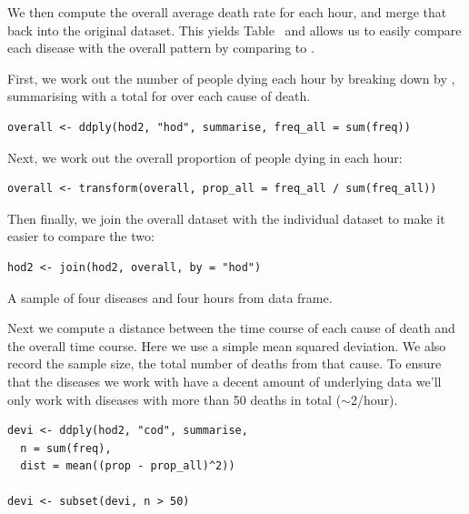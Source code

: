 \documentclass[article]{jss}
\begin{document}
We then compute the overall average death rate for each hour, and merge that back into the original dataset. This yields Table~ and allows us to easily compare each disease with the overall pattern by comparing  to .

First, we work out the number of people dying each hour by breaking down  by , summarising with a total for over each cause of death.

\begin{Verbatim}
overall <- ddply(hod2, "hod", summarise, freq_all = sum(freq))
\end{Verbatim}

Next, we work out the overall proportion of people dying in each hour:

\begin{Verbatim}
overall <- transform(overall, prop_all = freq_all / sum(freq_all))
\end{Verbatim}

Then finally, we join the overall dataset with the individual dataset to make it easier to compare the two:

\begin{Verbatim}
hod2 <- join(hod2, overall, by = "hod")
\end{Verbatim}

\begin{table}[htbp]
  \centering
  \subfloat[]{
    \label{tbl:counts:1}
  }%
  \subfloat[]{
    \label{tbl:counts:2}
  }%
  \subfloat[]{
    \label{tbl:counts:3}
  }%
  \subfloat[]{
    \label{tbl:counts:4}
  }
  
  \caption{A sample of four diseases and four hours from  data frame.}
  \label{tbl:counts}
\end{table}

Next we compute a distance between the time course of each cause of death and the overall time course. Here we use a simple mean squared deviation.  We also record the sample size, the total number of deaths from that cause. To ensure that the diseases we work with have a decent amount of underlying data we'll only work with diseases with more than 50 deaths in total ($\sim$2/hour).

\begin{Verbatim}
devi <- ddply(hod2, "cod", summarise, 
  n = sum(freq), 
  dist = mean((prop - prop_all)^2))

devi <- subset(devi, n > 50)
\end{Verbatim}
\end{document}
